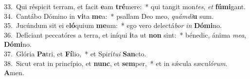 {33.~}Qui réspicit terram, et facit \textbf{e}am \textbf{tré}mere:~* qui tangit mon\textit{tes}, \textit{et} \textbf{fú}\textbf{mi}gant.\\
{34.~}Cantábo Dómino in \textbf{vi}ta \textbf{me}a:~* psallam Deo meo, \textit{quám}\textit{di}\textbf{u} sum.\\
{35.~}Jucúndum sit ei e\textbf{ló}quium \textbf{me}um:~* ego vero delectá\textit{bor} \textit{in} \textbf{Dó}\textbf{mi}no.\\
{36.~}Defíciant peccatóres a terra, et iníqui \textbf{i}ta ut \textbf{non} sint:~* bénedic, ánima \textit{me}\textit{a}, \textbf{Dó}\textbf{mi}no.\\
{37.~}Glória \textbf{Pa}tri, et \textbf{Fí}lio,~* et Spirí\textit{tu}\textit{i} \textbf{San}cto.\\
{38.~}Sicut erat in princípio, et \textbf{nunc}, et \textbf{sem}per,~* et in sǽcula sæcu\textit{ló}\textit{rum}. \textbf{A}men.\\
